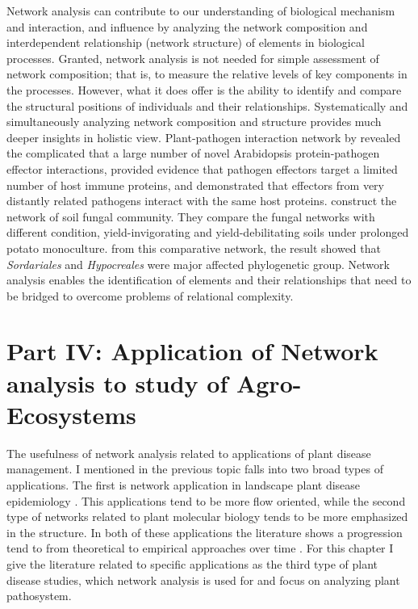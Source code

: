 Network analysis can contribute to our understanding of biological mechanism and interaction, and influence by analyzing the network composition and interdependent relationship (network structure) of elements in biological processes. Granted, network analysis is not needed for simple assessment of network composition; that is, to measure the relative levels of key components in the processes. However, what it does offer is the ability to identify and compare the structural positions of individuals and their relationships. Systematically and simultaneously analyzing network composition and structure provides much deeper insights in holistic view. Plant-pathogen interaction network by  revealed the complicated  that a large number of novel Arabidopsis protein-pathogen effector interactions, provided evidence that pathogen effectors target a limited number of host immune proteins, and demonstrated that effectors from very distantly related pathogens interact with the same host proteins.  construct the network of soil fungal community. They compare the fungal networks with different condition, yield-invigorating and yield-debilitating soils under prolonged potato monoculture. from this comparative network, the result showed that \textit{Sordariales} and \textit{Hypocreales} were major affected phylogenetic group. Network analysis enables the identification of elements and their relationships that need to be bridged to overcome problems of relational complexity.

\section*{Part IV: Application of Network analysis to study of Agro-Ecosystems}
\label{ch:}

The usefulness of network analysis related to applications of plant disease management. I mentioned in the previous topic falls into two broad types of applications. The first is network application in landscape plant disease epidemiology  . This applications tend to be more flow oriented, while the second type of networks related to plant molecular biology  tends to be more emphasized in the structure. In both of these applications the literature shows a progression tend to from theoretical to empirical approaches over time . For this chapter I give the literature related to specific applications as the third type of plant disease studies, which network analysis is used for and focus on analyzing plant pathosystem. 

